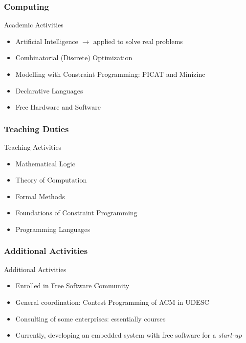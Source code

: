 \documentclass{beamer}
\begin{document}
\subsubsection{Computing}
\begin{frame}{Academic Activities}

\begin{itemize}
  \item Artificial Intelligence $\rightarrow $ applied to solve real problems
  \item Combinatorial (Discrete) Optimization
  \item Modelling with Constraint Programming: PICAT and Minizinc
  \item Declarative Languages
  \item Free Hardware and Software 
\end{itemize}



\end{frame}

\subsubsection{Teaching Duties}
\begin{frame}{Teaching Activities}

\begin{itemize}
  \item Mathematical Logic
  \item Theory of Computation
  \item Formal Methods
  \item Foundations of Constraint Programming
  \item Programming Languages
 
\end{itemize}
\end{frame}

\subsubsection{Additional Activities}
\begin{frame}{Additional Activities}

\begin{itemize}
  \item Enrolled in Free Software Community
  \item General coordination: Contest Programming of ACM in UDESC
  \item Consulting of some enterprises: essentially courses
  \item Currently, developing an embedded system with free software for a {\em start-up}
\end{itemize}
\end{frame}
\end{document}
